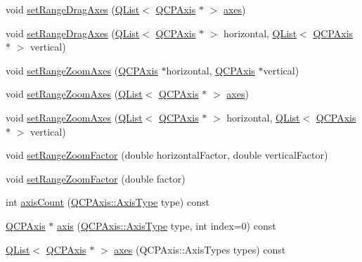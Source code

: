 \begin{DoxyCompactItemize}
\item 
void \hyperlink{class_q_c_p_axis_rect_af0fbc510147a2a54b9c8cd296e6df8ac}{set\+Range\+Drag\+Axes} (\hyperlink{class_q_list}{Q\+List}$<$ \hyperlink{class_q_c_p_axis}{Q\+C\+P\+Axis} $\ast$ $>$ \hyperlink{class_q_c_p_axis_rect_a66654d51ca611ef036ded36250cd2518}{axes})
\item 
void \hyperlink{class_q_c_p_axis_rect_a8366903edcb3bb703a8b0be783a85746}{set\+Range\+Drag\+Axes} (\hyperlink{class_q_list}{Q\+List}$<$ \hyperlink{class_q_c_p_axis}{Q\+C\+P\+Axis} $\ast$ $>$ horizontal, \hyperlink{class_q_list}{Q\+List}$<$ \hyperlink{class_q_c_p_axis}{Q\+C\+P\+Axis} $\ast$ $>$ vertical)
\item 
void \hyperlink{class_q_c_p_axis_rect_a9442cca2aa358405f39a64d51eca13d2}{set\+Range\+Zoom\+Axes} (\hyperlink{class_q_c_p_axis}{Q\+C\+P\+Axis} $\ast$horizontal, \hyperlink{class_q_c_p_axis}{Q\+C\+P\+Axis} $\ast$vertical)
\item 
void \hyperlink{class_q_c_p_axis_rect_a89c1ab7ee6d2a14b56c57c9a796ba623}{set\+Range\+Zoom\+Axes} (\hyperlink{class_q_list}{Q\+List}$<$ \hyperlink{class_q_c_p_axis}{Q\+C\+P\+Axis} $\ast$ $>$ \hyperlink{class_q_c_p_axis_rect_a66654d51ca611ef036ded36250cd2518}{axes})
\item 
void \hyperlink{class_q_c_p_axis_rect_ae29d6e9e54ebd981769c986e498ae118}{set\+Range\+Zoom\+Axes} (\hyperlink{class_q_list}{Q\+List}$<$ \hyperlink{class_q_c_p_axis}{Q\+C\+P\+Axis} $\ast$ $>$ horizontal, \hyperlink{class_q_list}{Q\+List}$<$ \hyperlink{class_q_c_p_axis}{Q\+C\+P\+Axis} $\ast$ $>$ vertical)
\item 
void \hyperlink{class_q_c_p_axis_rect_a895d7ac745ea614e04056244b3c138ac}{set\+Range\+Zoom\+Factor} (double horizontal\+Factor, double vertical\+Factor)
\item 
void \hyperlink{class_q_c_p_axis_rect_ae83d187b03fc6fa4f00765ad50cd3fc3}{set\+Range\+Zoom\+Factor} (double factor)
\item 
int \hyperlink{class_q_c_p_axis_rect_a16e3e4646e52e4b5d5b865076c29ae58}{axis\+Count} (\hyperlink{class_q_c_p_axis_ae2bcc1728b382f10f064612b368bc18a}{Q\+C\+P\+Axis\+::\+Axis\+Type} type) const 
\item 
\hyperlink{class_q_c_p_axis}{Q\+C\+P\+Axis} $\ast$ \hyperlink{class_q_c_p_axis_rect_a560de44e47a4af0f86c59102a094b1e4}{axis} (\hyperlink{class_q_c_p_axis_ae2bcc1728b382f10f064612b368bc18a}{Q\+C\+P\+Axis\+::\+Axis\+Type} type, int index=0) const 
\item 
\hyperlink{class_q_list}{Q\+List}$<$ \hyperlink{class_q_c_p_axis}{Q\+C\+P\+Axis} $\ast$ $>$ \hyperlink{class_q_c_p_axis_rect_a66654d51ca611ef036ded36250cd2518}{axes} (Q\+C\+P\+Axis\+::\+Axis\+Types types) const 

\end{DoxyCompactItemize}
